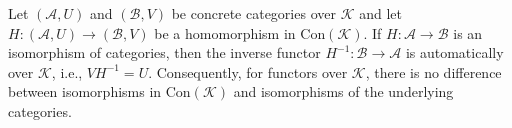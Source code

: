 Let $(\mathcal{A}, U)$ and $(\mathcal{B}, V)$ be concrete categories over $\mathcal{K}$ and let $H: (\mathcal{A}, U) \to (\mathcal{B}, V)$ be a homomorphism in $\text{Con}(\mathcal{K})$. If $H: \mathcal{A} \to \mathcal{B}$ is an isomorphism of categories, then the inverse functor $H^{-1}: \mathcal{B} \to \mathcal{A}$ is automatically over $\mathcal{K}$, i.e., $V H^{-1} = U$. Consequently, for functors over $\mathcal{K}$, there is no difference between isomorphisms in $\text{Con}(\mathcal{K})$ and isomorphisms of the underlying categories.
